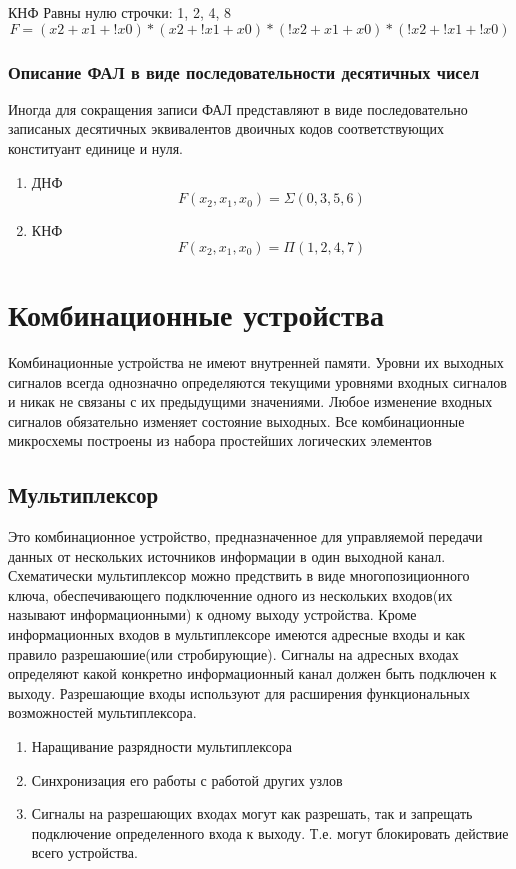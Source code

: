 \documentclass[a4paper]{article}
\begin{document}


КНФ
Равны нулю строчки: 1, 2, 4, 8
$$ F = (x2+x1+!x0)*(x2+!x1+x0)*(!x2+x1+x0)*(!x2+!x1+!x0)$$



\subsubsection{Описание ФАЛ в виде последовательности десятичных чисел}
Иногда для сокращения записи ФАЛ представляют в виде последовательно записаных десятичных эквивалентов двоичных кодов соответствующих конституант единице и нуля.

\begin{enumerate}
\item ДНФ
$$ F(x_2, x_1, x_0) = \Sigma(0, 3, 5, 6) $$
\item КНФ
$$ F(x_2, x_1, x_0) = \Pi(1, 2, 4, 7) $$
\end{enumerate}

\section{Комбинационные устройства}
Комбинационные устройства не имеют внутренней памяти.
Уровни их выходных сигналов всегда однозначно определяются текущими уровнями входных сигналов и никак не связаны с их предыдущими значениями.
Любое изменение входных сигналов обязательно изменяет состояние выходных.
Все комбинационные микросхемы построены из набора простейших логических элементов
\subsection{Мультиплексор}
Это комбинационное устройство, предназначенное для управляемой передачи данных от нескольких источников информации в один выходной канал. Схематически мультиплексор можно предствить в виде многопозиционного ключа, обеспечивающего подключенние одного из нескольких входов(их называют информационными) к одному выходу устройства.
Кроме информационных входов в мультиплексоре имеются адресные входы и как правило разрешаюшие(или стробирующие).
Сигналы на адресных входах определяют какой конкретно информационный канал должен быть подключен к выходу.
Разрешающие входы используют для расширения функциональных возможностей мультиплексора.
\begin{enumerate}
    \item Наращивание разрядности мультиплексора
    \item Синхронизация его работы с работой других узлов
    \item Сигналы на разрешающих входах могут как разрешать, так и запрещать подключение определенного входа к выходу. Т.е. могут блокировать действие всего устройства.

\end{enumerate}
\end{document}
